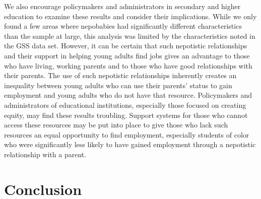 \documentclass[12pt]{article}
\begin{document}
We also encourage policymakers and administrators in secondary and higher education to examine these results and consider their implications. While we only found a few areas where nepobabies had significantly different characteristics than the sample at large, this analysis was limited by the characteristics noted in the GSS data set. However, it can be certain that such nepotistic relationships and their support in helping young adults find jobs gives an advantage to those who have living, working parents and to those who have good relationships with their parents. The use of such nepotistic relationships inherently creates an inequality between young adults who can use their parents’ status to gain employment and young adults who do not have that resource. Policymakers and administrators of educational institutions, especially those focused on creating equity, may find these results troubling. Support systems for those who cannot access these resources may be put into place to give those who lack such resources an equal opportunity to find employment, especially students of color who were significantly less likely to have gained employment through a nepotistic relationship with a parent.


\section{Conclusion}
\label{sec:conclusion}
\end{document}
